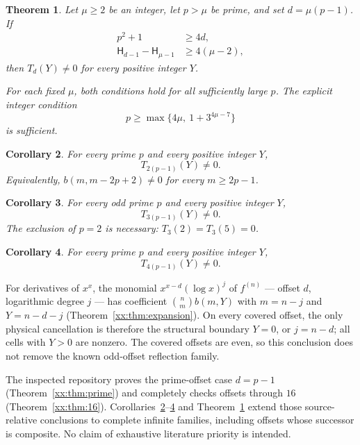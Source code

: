 \documentclass[11pt,a4paper]{article}
\numberwithin{equation}{section}
\newtheorem{theorem}{Theorem}[section]
\newtheorem{corollary}[theorem]{Corollary}
\theoremstyle{definition}
\theoremstyle{remark}
\theoremstyle{plain}
\begin{document}
\begin{theorem}\label{xx:pm:main}
Let $\mu\ge2$ be an integer, let $p>\mu$ be prime, and set $d=\mu(p-1)$. If
\begin{align}
 p^2+1&\ge 4d,\label{xx:pm:A}\\
 \mathsf H_{d-1}-\mathsf H_{\mu-1}&\ge4(\mu-2),\label{xx:pm:B}
\end{align}
then $T_d(Y)\ne0$ for every positive integer $Y$.

For each fixed $\mu$, both conditions hold for all sufficiently large $p$. The
explicit integer condition
\begin{equation}\label{xx:pm:threshold}
 p\ge\max\{4\mu,\ 1+3^{4\mu-7}\}
\end{equation}
is sufficient.
\end{theorem}

\begin{corollary}\label{xx:pm:twice}
For every prime $p$ and every positive integer $Y$,
\[
 T_{2(p-1)}(Y)\ne0.
\]
Equivalently, $b(m,m-2p+2)\ne0$ for every $m\ge2p-1$.
\end{corollary}

\begin{corollary}\label{xx:pm:triple}
For every odd prime $p$ and every positive integer $Y$,
\[
 T_{3(p-1)}(Y)\ne0.
\]
The exclusion of $p=2$ is necessary: $T_3(2)=T_3(5)=0$.
\end{corollary}

\begin{corollary}\label{xx:pm:four}
For every prime $p$ and every positive integer $Y$,
\[
 T_{4(p-1)}(Y)\ne0.
\]
\end{corollary}

For derivatives of $x^x$, the monomial $x^{x-d}(\log x)^j$ of $f^{(n)}$ ---
offset $d$, logarithmic degree $j$ --- has coefficient $\binom nm b(m,Y)$ with
$m=n-j$ and $Y=n-d-j$ (Theorem~\ref{xx:thm:expansion}).  On every covered
offset, the only physical cancellation is therefore the structural boundary
$Y=0$, or $j=n-d$; all cells with $Y>0$ are nonzero. The covered offsets are
even, so this conclusion does not remove the known odd-offset reflection
family.

The inspected repository proves the prime-offset case $d=p-1$
(Theorem~\ref{xx:thm:prime}) and completely checks offsets through $16$
(Theorem~\ref{xx:thm:16}).  Corollaries~\ref{xx:pm:twice}--\ref{xx:pm:four}
and Theorem~\ref{xx:pm:main} extend those source-relative conclusions to
complete infinite families, including offsets whose successor is composite. No
claim of exhaustive literature priority is intended.
\end{document}
